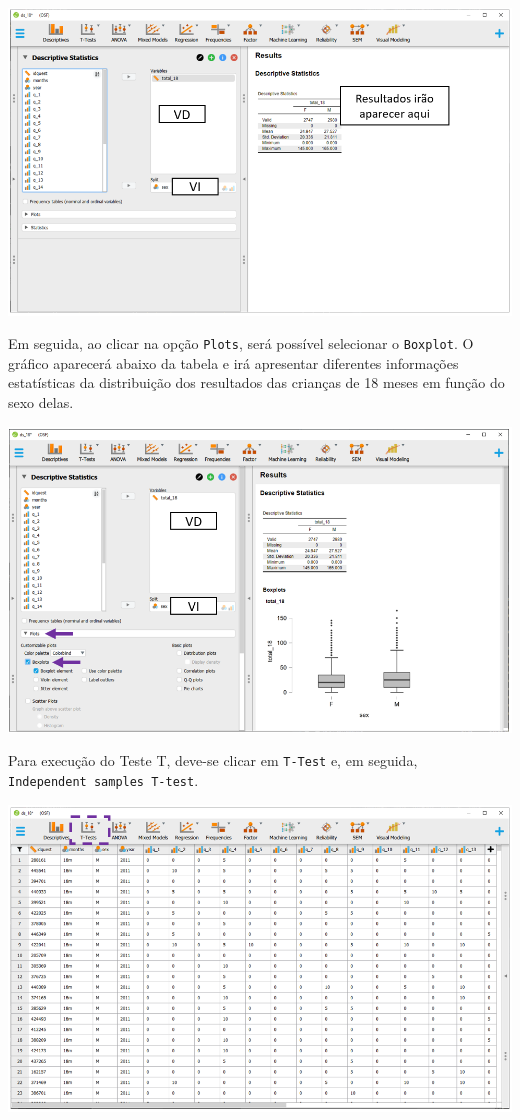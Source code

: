 \documentclass[
]{book}
\begin{document}
\includegraphics{./img/cap_testet_tabela_descritiva.png}

Em seguida, ao clicar na opção \texttt{Plots}, será possível selecionar
o \texttt{Boxplot}. O gráfico aparecerá abaixo da tabela e irá
apresentar diferentes informações estatísticas da distribuição dos
resultados das crianças de 18 meses em função do sexo delas.

\includegraphics{./img/cap_testet_tabela.png}

Para execução do Teste T, deve-se clicar em \texttt{T-Test} e, em
seguida, \texttt{Independent\ samples\ T-test}.

\includegraphics{./img/cap_testet_interface1.png}
\end{document}
